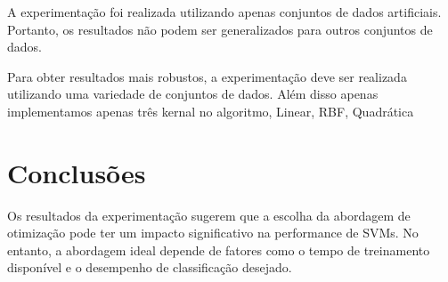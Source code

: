 \documentclass{article}
\begin{document}
A experimentação foi realizada utilizando apenas conjuntos de dados artificiais. Portanto, os resultados não podem ser generalizados para outros conjuntos de dados.

Para obter resultados mais robustos, a experimentação deve ser realizada utilizando uma variedade de conjuntos de dados. Além disso apenas implementamos apenas três kernal no algoritmo, Linear, RBF, Quadrática 

\section{Conclusões}

Os resultados da experimentação sugerem que a escolha da abordagem de otimização pode ter um impacto significativo na performance de SVMs. No entanto, a abordagem ideal depende de fatores como o tempo de treinamento disponível e o desempenho de classificação desejado.

\printbibliography
%
\end{document}
